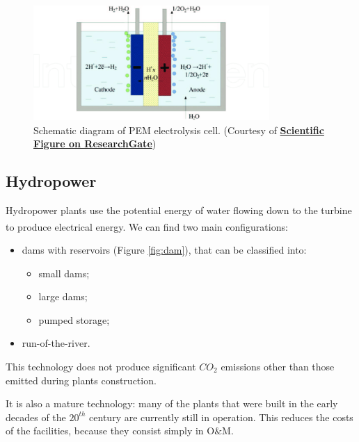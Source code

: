 \begin{figure}[hp]
    \centering
    \includegraphics[width=0.8\textwidth]{Chapters/Pictures/Schematic-diagram-of-PEM-electrolysis-cell-33.png}
    \caption{Schematic diagram of PEM electrolysis cell.
    (Courtesy of \textbf{\href{https://www.researchgate.net/figure/Schematic-diagram-of-PEM-electrolysis-cell-33_fig1_327179309}{Scientific Figure on ResearchGate}})}
    \label{fig:pem}
\end{figure}

\subsection{Hydropower}
Hydropower plants use the potential energy of water flowing down to the turbine to produce electrical energy. We can find two main configurations\textsuperscript{\cite{lakohydro2010}}:
\begin{itemize}
    \item dams with reservoirs (Figure \ref{fig:dam}), that can be classified into:
    \begin{itemize}
        \item small dams;
        \item large dams;
        \item pumped storage;
    \end{itemize}
    \item run-of-the-river.
\end{itemize}

This technology does not produce significant $CO_2$ emissions other than those emitted during plants construction. 

It is also a mature technology: many of the plants that were built in the early decades of the $20^{th}$ century are currently still in operation. This reduces the costs of the facilities, because they consist simply in O$\&$M.

